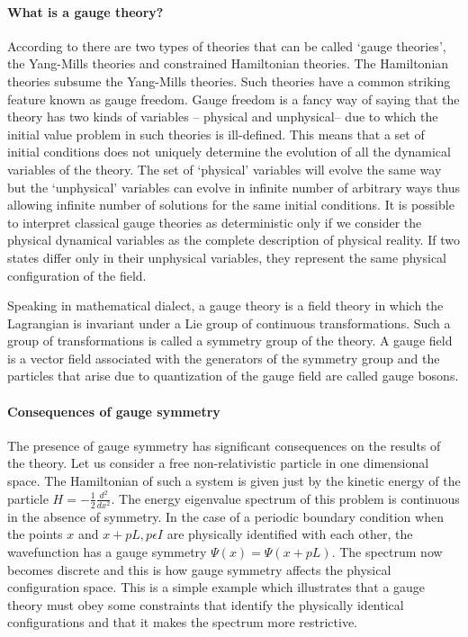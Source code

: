  \paragraph{What is a gauge theory?}
According to there are two types of theories
that can be called \lq gauge theories\rq, the Yang-Mills theories and
constrained Hamiltonian theories. The Hamiltonian theories subsume the
Yang-Mills theories. Such theories have a common striking feature known
as gauge freedom. Gauge freedom is a fancy way of saying that the
theory has two kinds of variables -- physical and unphysical-- due to
which the initial value problem in such theories is ill-defined. This
means that a set of initial conditions does not uniquely determine the
evolution of all the dynamical variables of the theory. The set of
`physical' variables will evolve the same way but the `unphysical'
variables can evolve in infinite number of arbitrary ways thus allowing
infinite number of solutions for the same initial conditions. It is
possible to interpret classical gauge theories as deterministic only if
we consider the physical dynamical variables as the complete description
of physical reality. If two states differ only in their unphysical
variables, they represent the same physical configuration of the field.

Speaking in mathematical dialect, a gauge theory is a field theory in
which the Lagrangian is invariant under a Lie group of continuous
transformations. Such a group of transformations is called a symmetry
group of the theory. A gauge field is a vector field associated with the
generators of the symmetry group and the particles that arise due to
quantization of the gauge field are called gauge bosons.

\paragraph{Consequences of gauge symmetry}
The presence of gauge symmetry has significant consequences on the
results of the theory. Let us consider a free non-relativistic particle
in one dimensional space. The Hamiltonian of such a system is given just
by the kinetic energy of the particle $ H= -\frac{1}{2}
\frac{d^{2}}{dx^{2}} $. The energy eigenvalue spectrum of this problem is
continuous in the absence of symmetry. In the case of a periodic boundary
condition when the points $x$ and $ x+pL, p \epsilon I $ are physically
identified with each other, the wavefunction has a gauge symmetry
$\Psi(x)=\Psi(x+pL)$. The spectrum now becomes discrete and this is how
gauge symmetry affects the physical configuration space. This
is a simple example which illustrates that a gauge theory must obey some
constraints that identify the physically identical configurations and
that it makes the spectrum more restrictive.

